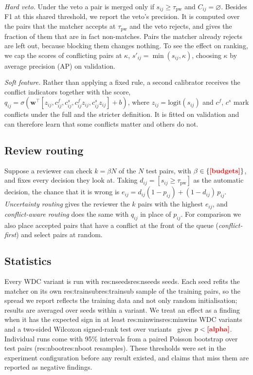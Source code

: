 \documentclass[conference]{IEEEtran}
\newcommand{\R}[1]{\ifcsname res:#1\endcsname\csname res:#1\endcsname\else{\color{red}\textbf{[#1]}}\fi}
\begin{document}
\emph{Hard veto.} Under the veto a pair is merged only if $s_{ij}\ge\tau_{\text{pw}}$ and
$C_{ij}=\varnothing$. Besides F1 at this shared threshold, we report the veto's precision. It is computed
over the pairs that the matcher accepts at $\tau_{\text{pw}}$ and the veto rejects, and gives the fraction
of them that are in fact non-matches. Pairs the matcher already rejects are left out, because blocking
them changes nothing. To see the effect on ranking, we cap the scores of conflicting pairs at $\kappa$,
$s'_{ij}=\min(s_{ij},\kappa)$, choosing $\kappa$ by average precision (AP) on validation.

\emph{Soft feature.} Rather than applying a fixed rule, a second calibrator receives the conflict
indicators together with the score,
$q_{ij}=\sigma(\mathbf{w}^\top[z_{ij},c^{f}_{ij},c^{s}_{ij},c^{f}_{ij}z_{ij},c^{s}_{ij}z_{ij}]+b)$, where
$z_{ij}=\mathrm{logit}(s_{ij})$ and $c^{f}$, $c^{s}$ mark conflicts under the full and the stricter
definition. It is fitted on validation and can therefore learn that some conflicts matter and others do
not.

\subsection{Review routing}
Suppose a reviewer can check $k=\beta N$ of the $N$ test pairs, with $\beta\in\{\R{budgets}\}$, and fixes
every decision they look at. Taking $d_{ij}=[s_{ij}\ge\tau_{\text{pw}}]$ as the automatic decision, the
chance that it is wrong is $e_{ij}=d_{ij}(1-p_{ij})+(1-d_{ij})\,p_{ij}$. \emph{Uncertainty routing}
gives the reviewer the $k$ pairs with the highest $e_{ij}$, and \emph{conflict-aware routing} does the
same with $q_{ij}$ in place of $p_{ij}$. For comparison we also place accepted pairs that have a conflict
at the front of the queue (\emph{conflict-first}) and select pairs at random.

\subsection{Statistics}
Every WDC variant is run with \R{nseeds} seeds. Each seed refits the matcher on its own \R{trainsub}
sample of the training pairs, so the spread we report reflects the training data and not only random
initialisation; results are averaged over seeds within a variant. We treat an effect as a finding when
it has the expected sign in at least \R{minwins} WDC variants and a two-sided Wilcoxon signed-rank test
over variants~\cite{wilcoxon1945} gives $p<\R{alpha}$. Individual runs come with 95\% intervals from a
paired Poisson bootstrap over test pairs (\R{nboot} resamples). These thresholds were set in the
experiment configuration before any result existed, and claims that miss them are reported as negative
findings.
\end{document}
